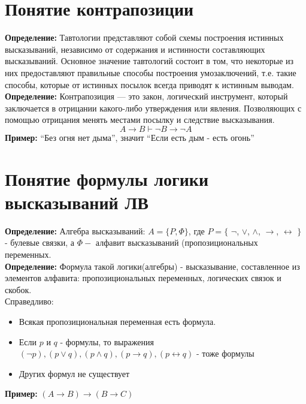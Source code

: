 \documentclass[../main.tex]{subfiles}
\begin{document}
\section{Понятие контрапозиции}
\textbf{Определение:
}Тавтологии представляют собой схемы построения истинных высказываний, независимо от содержания и истинности составляющих высказываний. Основное значение тавтологий состоит в том, что некоторые из них предоставляют правильные способы построения умозаключений, т.е. такие способы, которые от истинных посылок всегда приводят к истинным выводам. \\
\textbf{
	Определение:
}Контрапозиция — это закон, логический инструмент, который заключается в отрицании какого-либо утверждения или явления. Позволяющих с помощью отрицания менять местами посылку и следствие высказывания.
\[A \to B \vdash \lnot B \to \lnot A\]
\textbf{
	Пример:
}``Без огня нет дыма'', значит ``Если есть дым - есть огонь''

\section{Понятие формулы логики высказываний ЛВ}
\textbf{Определение:
}Алгебра высказываний: $A = \{P, \varPhi \}$, где $P = \{$ $\lnot$, $\lor$, $\land$, $\rightarrow$, $\leftrightarrow$ $\}$ - булевые связки, а $\varPhi -$ алфавит высказываний (пропозициональных переменных.\\
\textbf{
	Определение:
}Формула такой логики(алгебры) - высказывание, составленное из элементов алфавита: пропозициональных переменных, логических связок и скобок.\\
Справедливо:
\begin{itemize}
	\item Всякая пропозициональная переменная есть формула.
	\item Если $p$ и $q$ - формулы, то выражения $(\lnot p), (p \lor q), (p \land q), (p \to q), (p \leftrightarrow q)$ - тоже формулы
	\item Других формул не существует
\end{itemize}
\textbf{Пример:
}$(A \rightarrow B) \to (B \rightarrow C)$

\end{document}
